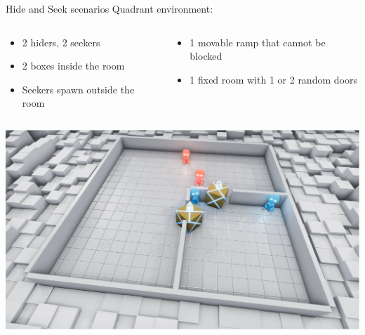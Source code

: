 \documentclass[9pt, hyperref={pdfusetitle,colorlinks=true,allcolors=DarkBlue}]{beamer}
\begin{document}
\begin{frame}{Hide and Seek scenarios}
Quadrant environment:
\begin{columns}
\begin{column}{0.5\textwidth}
\begin{itemize}
    \item 2 hiders, 2 seekers
    \item 2 boxes inside the room
    \item Seekers spawn outside the room
    \end{itemize}{}
\end{column}
\begin{column}{0.5\textwidth}  %
    \begin{itemize}
    \item 1 movable ramp that cannot be blocked
    \item 1 fixed room with 1 or 2 random doors
    \end{itemize}{}
\end{column}
\end{columns}
\begin{center}
    \includegraphics[scale=0.25]{quadrant.png}
\end{center}{}
\end{frame}
\end{document}
